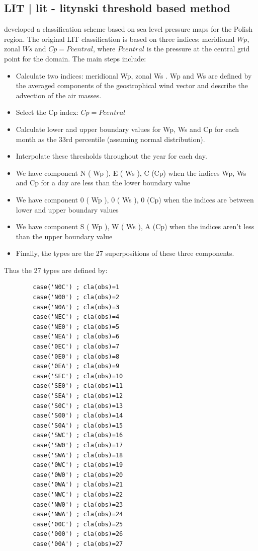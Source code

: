 \documentclass[12pt, oneside, a4paper, headsepline, plainheadsepline]{scrbook}
\begin{document}
\subsection{LIT | lit - litynski threshold based method}

\citet{Litynski1969} developed a classification scheme based on sea level pressure maps for the Polish region. The original LIT classification is based on three indices: meridional $Wp$, zonal $Ws$ and $Cp = Pcentral$,  where $Pcentral$ is the pressure at the central grid point for the domain. The main steps include:

\begin{itemize}
\item Calculate two indices: meridional Wp, zonal Ws . Wp and Ws are defined by the averaged components of the geostrophical wind vector and describe the advection of the air masses.
\item Select the Cp index: $Cp = Pcentral$
\item Calculate lower and upper boundary values for Wp, Ws and Cp for each month as the 33rd percentile (assuming normal distribution).
\item Interpolate these thresholds throughout the year for each day.
\item We have component N ( Wp ), E ( Ws ), C (Cp) when the indices Wp, Ws and Cp for a day are less than the lower boundary value
\item We have component 0 ( Wp ), 0 ( Ws ), 0 (Cp) when the indices are between lower and upper boundary values
\item We have component S ( Wp ), W ( Ws ), A (Cp) when the indices aren't less than the upper boundary value
\item Finally, the types are the 27 superpositions of these three components.
\end{itemize}

Thus the 27 types are defined by:
\begin{scriptsize}
\begin{lstlisting}
        case('N0C') ; cla(obs)=1
        case('N00') ; cla(obs)=2
        case('N0A') ; cla(obs)=3
        case('NEC') ; cla(obs)=4
        case('NE0') ; cla(obs)=5
        case('NEA') ; cla(obs)=6
        case('0EC') ; cla(obs)=7
        case('0E0') ; cla(obs)=8
        case('0EA') ; cla(obs)=9
        case('SEC') ; cla(obs)=10
        case('SE0') ; cla(obs)=11
        case('SEA') ; cla(obs)=12
        case('S0C') ; cla(obs)=13
        case('S00') ; cla(obs)=14
        case('S0A') ; cla(obs)=15
        case('SWC') ; cla(obs)=16
        case('SW0') ; cla(obs)=17
        case('SWA') ; cla(obs)=18
        case('0WC') ; cla(obs)=19
        case('0W0') ; cla(obs)=20
        case('0WA') ; cla(obs)=21
        case('NWC') ; cla(obs)=22
        case('NW0') ; cla(obs)=23
        case('NWA') ; cla(obs)=24
        case('00C') ; cla(obs)=25
        case('000') ; cla(obs)=26
        case('00A') ; cla(obs)=27
\end{lstlisting}
\end{scriptsize}
\end{document}
